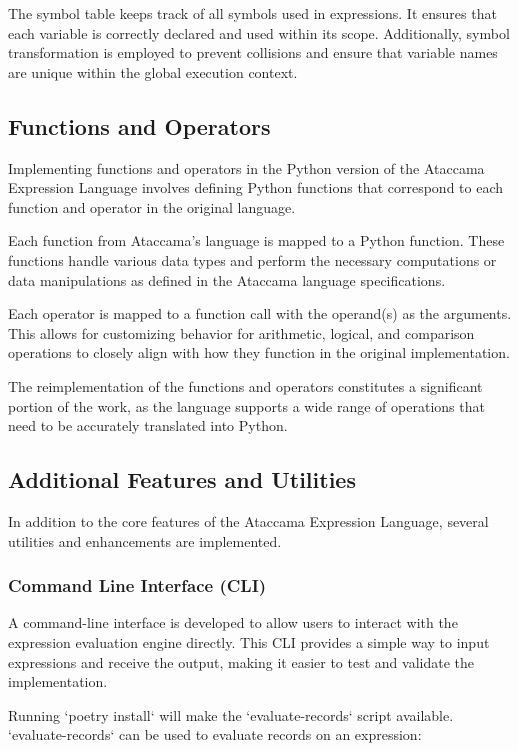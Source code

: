  The symbol table keeps track of all symbols used in expressions. It ensures that each variable is correctly declared and used within its scope. Additionally, symbol transformation is employed to prevent collisions and ensure that variable names are unique within the global execution context.

 \subsection{Functions and Operators}

Implementing functions and operators in the Python version of the Ataccama Expression Language involves defining Python functions that correspond to each function and operator in the original language.

Each function from Ataccama’s language is mapped to a Python function. These functions handle various data types and perform the necessary computations or data manipulations as defined in the Ataccama language specifications.

Each operator is mapped to a function call with the operand(s) as the arguments. This allows for customizing behavior for arithmetic, logical, and comparison operations to closely align with how they function in the original implementation.

The reimplementation of the functions and operators constitutes a significant portion of the work, as the language supports a wide range of operations that need to be accurately translated into Python.

\subsection{Additional Features and Utilities}

In addition to the core features of the Ataccama Expression Language, several utilities and enhancements are implemented.

\subsubsection{Command Line Interface (CLI)}

A command-line interface is developed to allow users to interact with the expression evaluation engine directly. This CLI provides a simple way to input expressions and receive the output, making it easier to test and validate the implementation.

Running `poetry install` will make the `evaluate-records` script available.
`evaluate-records` can be used to evaluate records on an expression:


